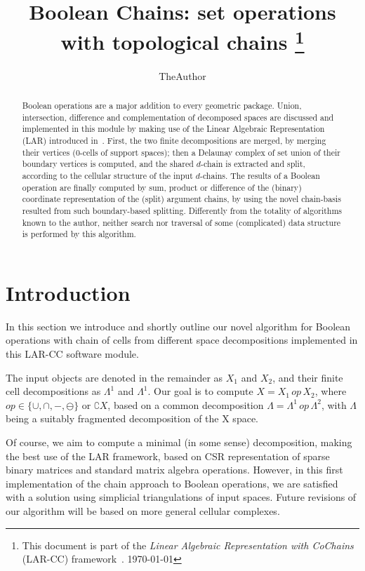 \documentclass[11pt,oneside]{article}	%
\title{Boolean Chains: set operations with topological chains
\footnote{This document is part of the \emph{Linear Algebraic Representation with CoChains} (LAR-CC) framework~\cite{cclar-proj:2013:00}. \today}
}
\author{TheAuthor}
\begin{document}
\maketitle

\begin{abstract}
Boolean operations are a major addition to every geometric package. Union, intersection, difference and complementation of decomposed spaces are discussed and implemented in this module by making use of the Linear Algebraic Representation (LAR) introduced in~\cite{Dicarlo:2014:TNL:2543138.2543294}. First, the two finite decompositions are merged, by merging their vertices (0-cells of support spaces); then a Delaunay complex of set union of their boundary vertices is computed, and the shared $d$-chain is extracted and split, according to the cellular structure of the input $d$-chains. The results of a Boolean operation are finally computed by sum, product or difference of the (binary) coordinate representation of the (split) argument chains, by using the novel chain-basis resulted from such boundary-based splitting. Differently from the totality of algorithms known to the author, neither search nor traversal of some (complicated) data structure is performed by this algorithm. 
\end{abstract}

\tableofcontents
\section{Introduction}

In this section we introduce and shortly outline our novel algorithm for Boolean operations with chain of cells from different space decompositions implemented in this LAR-CC software module.

The input objects are denoted in the remainder as $X_1$ and $X_2$, and their finite cell decompositions as $\Lambda^1$ and $\Lambda^1$. Our goal is to compute $X = X_1\, op\, X_2$, where $op \in \{\cup ,\cap , - ,\ominus \}$ or $\complement X$, based on a common decomposition $\Lambda = \Lambda^1\, op\, \Lambda^2$, with $\Lambda$ being a suitably fragmented decomposition of the X space.

Of course, we aim to compute a minimal (in some sense) decomposition, making the best use of the LAR framework, based on CSR representation of sparse binary matrices and standard matrix algebra operations.
However, in this first implementation of the chain approach to Boolean operations, we are satisfied with a solution using simplicial triangulations of input spaces. Future revisions of our algorithm will be based on more general cellular complexes.
\end{document}
